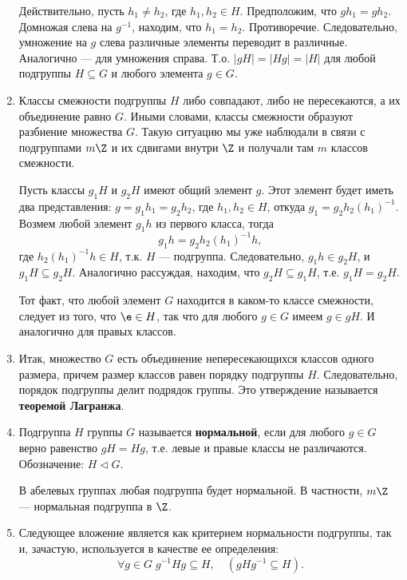 \begin{enumerate}
Действительно, пусть $h_1\ne h_2$, где $h_1,h_2\in H$. Предположим, что $gh_1=gh_2$. Домножая слева на $g^{-1}$, находим, что $h_1=h_2$. Противоречие. Следовательно, умножение на $g$ слева различные элементы переводит в различные. Аналогично --- для умножения справа. Т.о. $|gH|=|Hg|=|H|$ для любой подгруппы $H\subseteq G$ и любого элемента $g\in G$.

\item Классы смежности подгруппы $H$ либо совпадают, либо не пересекаются, а их объединение равно $G$. Иными словами, классы смежности образуют разбиение множества $G$. Такую ситуацию мы уже наблюдали в связи с подгруппами $m\Z$ и их сдвигами внутри $\Z$ и получали там $m$ классов смежности.

Пусть классы $g_1H$ и $g_2H$ имеют общий элемент $g$. Этот элемент будет иметь два представления: $g=g_1h_1=g_2h_2$, где $h_1,h_2\in H$, откуда $g_1=g_2h_2(h_1)^{-1}$. Возмем любой элемент $g_1h$ из первого класса, тогда
$$
g_1h = g_2h_2(h_1)^{-1}h,
$$
где $h_2(h_1)^{-1}h\in H$, т.к. $H$ --- подгруппа. Следовательно, $g_1h\in g_2H$, и $g_1H\subseteq g_2H$. Аналогично рассуждая, находим, что $g_2H\subseteq g_1H$, т.е. $g_1H=g_2H$.

Тот факт, что любой элемент $G$ находится в каком-то классе смежности, следует из того, что $\e\in H$, так что для любого $g\in G$ имеем $g\in gH$. И аналогично для правых классов.

\item Итак, множество $G$ есть объединение непересекающихся классов одного размера, причем размер классов равен порядку подгруппы $H$. Следовательно, порядок подгруппы делит подрядок группы. Это утверждение называется \textbf{теоремой Лагранжа}.



\item Подгруппа $H$ группы $G$ называется \textbf{нормальной}, если для любого $g\in G$ верно равенство $gH=Hg$, т.е. левые и правые классы не различаются. Обозначение: $H\vartriangleleft G$.

В абелевых группах любая подгруппа будет нормальной. В частности, $m\Z$ --- нормальная подгруппа в $\Z$.

\item Следующее вложение является как критерием нормальности подгруппы, так и, зачастую, используется в качестве ее определения:
\begin{equation}\label{normcriteria}
\forall g\in G\;g^{-1}Hg\subseteq H,\quad (gHg^{-1}\subseteq H).
\end{equation}


\end{enumerate}
